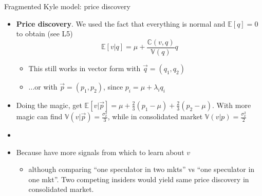 \documentclass[english,10pt
,aspectratio=169
]{beamer}
\begin{document}
\begin{frame}{Fragmented Kyle model: price discovery}
	\begin{itemize}
		\item \textbf{Price discovery}. We used the fact that everything is normal and $\mathbb{E}[q]=0$ to obtain (see L5)
		$$
			\mathbb{E}[v|q] = \mu +\frac{\mathbb{C}(v,q)}{\mathbb{V}(q)} q
		$$
		\begin{itemize}
			\item This still works in vector form with $\vec{q}=(q_1,q_2)$
			\item ...or with $\vec{p}=(p_1,p_2)$, since $p_i = \mu + \lambda_i q_i$
		\end{itemize}
		\pause
		\item Doing the magic, get $\mathbb{E}[v|\vec{p}] = \mu + \frac{2}{3}(p_1 - \mu) + \frac{2}{3}(p_2 - \mu)$. With more magic can find $\mathbb{V}(v|\vec{p}) = \frac{\sigma^2_v}{3}$, while in consolidated market $\mathbb{V}(v|p) = \frac{\sigma^2_v}{2}$
		\item {}
		\item Because have more signals from which to learn about $v$ 
		\pause 
		\begin{itemize}
			\item although comparing ``one speculator in two mkts'' vs ``one speculator in one mkt''. Two competing insiders would yield \alert{same price discovery} in consolidated market.
		\end{itemize}
	\end{itemize}
\end{frame}
\end{document}
